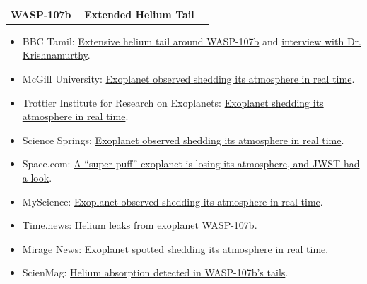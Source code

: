 \documentclass[10pt,a4paper]{article}
\makeatletter
\newcommand{\grantheading}[2]{%
\begin{tabularx}{\textwidth}{
    @{}
    >{\raggedright\arraybackslash}X
    >{\raggedleft\arraybackslash}p{4.5cm}
    @{}
}
\textbf{#1} & #2
\end{tabularx}
}
\newenvironment{lightitems}
{%
  \begin{itemize}[
      label=\textcolor{entrylight}{\textbullet},
      leftmargin=1.3em,
      itemsep=1pt,
      topsep=2pt,
      parsep=0pt
  ]
  \color{entrylight}
}
{%
  \end{itemize}
}
\makeatother
\begin{document}
\grantheading
{WASP-107b -- Extended Helium Tail}
{2025}
\begin{lightitems}
\item
\vspace{-1.5mm}BBC Tamil:
\href{https://www.bbc.com/tamil/articles/c0jven4j0ngo}
{Extensive helium tail around WASP-107b} and
\href{https://www.bbc.com/tamil/articles/c4gr40qw53xo}
{interview with Dr. Krishnamurthy}.
\item
McGill University:
\href{https://www.mcgill.ca/newsroom/channels/news/exoplanet-observed-shedding-its-atmosphere-real-time-369356}
{Exoplanet observed shedding its atmosphere in real time}.
\item
Trottier Institute for Research on Exoplanets:
\href{https://exoplanetes.umontreal.ca/en/exoplanet-caught-shedding-its-atmosphere-in-real-time/}
{Exoplanet shedding its atmosphere in real time}.
\item
Science Springs:
\href{https://sciencesprings.wordpress.com/2025/12/02/from-the-university-of-chicago-and-mcgill-university-universite-mcgill-ca-and-webb-exoplanet-is-observed-shedding-its-atmosphere-in-real-time/}
{Exoplanet observed shedding its atmosphere in real time}.
\item
Space.com:
\href{https://www.space.com/astronomy/james-webb-space-telescope/giant-helium-cloud-caught-escaping-from-puffy-exoplanet-by-jwst}
{A ``super-puff'' exoplanet is losing its atmosphere, and JWST had a look}.
\item
MyScience:
\href{https://www.myscience.org/en/news/2025/exoplanet_is_observed_shedding_its_atmosphere_in_real_time-2025-mcgill}
{Exoplanet observed shedding its atmosphere in real time}.
\item
Time.news:
\href{https://time.news/helium-leaks-from-exoplanet-wasp-107b-webb-telescope-discovery/}
{Helium leaks from exoplanet WASP-107b}.
\item
Mirage News:
\href{https://www.miragenews.com/exoplanet-spotted-shedding-atmosphere-live-1580797/}
{Exoplanet spotted shedding its atmosphere in real time}.
\item
ScienMag:
\href{https://scienmag.com/helium-absorption-detected-in-wasp-107bs-tails/}
{Helium absorption detected in WASP-107b's tails}.
\end{lightitems}
\end{document}
